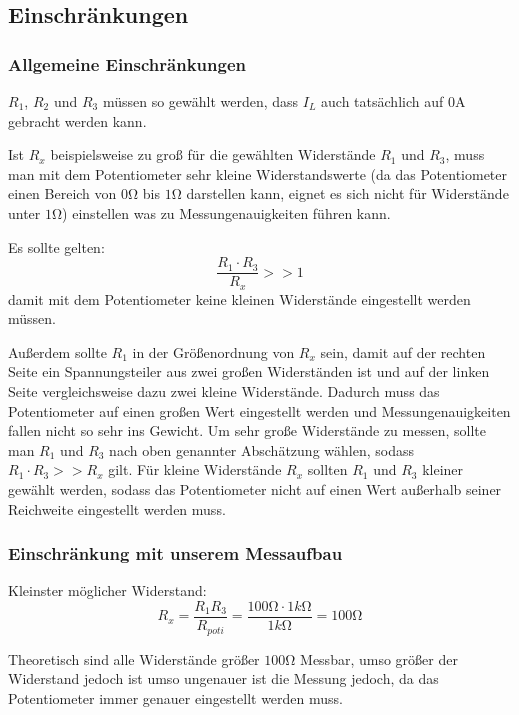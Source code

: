 \documentclass[10pt]{report}
\begin{document}
        \subsection{Einschränkungen}
        \subsubsection{Allgemeine Einschränkungen}
        $R_1$, $R_2$ und $R_3$ müssen so gewählt werden, dass $I_L$ auch tatsächlich
        auf $0$A gebracht werden kann.

        \vspace{0.5cm}

        Ist $R_x$ beispielsweise zu groß für die gewählten Widerstände $R_1$ und $R_3$, muss
        man mit dem Potentiometer sehr kleine Widerstandswerte (da das Potentiometer einen
		Bereich von $0\si{\ohm}$ bis $1\si{\ohm}$ darstellen kann, eignet es sich nicht für
		Widerstände unter $1\si{\ohm}$) einstellen was zu Messungenauigkeiten führen kann.

        Es sollte gelten:
        \begin{equation*}
            \frac{R_1 \cdot R_3}{R_x} >> 1
        \end{equation*}
        damit mit dem Potentiometer keine kleinen Widerstände eingestellt werden
        müssen.

        Außerdem sollte $R_1$ in der Größenordnung von $R_x$ sein, damit auf der
        rechten Seite ein Spannungsteiler aus zwei großen Widerständen ist und auf
        der linken Seite vergleichsweise dazu zwei kleine Widerstände. Dadurch
        muss das Potentiometer auf einen großen Wert eingestellt werden und
        Messungenauigkeiten fallen nicht so sehr ins Gewicht.
		Um sehr große Widerstände zu messen, sollte man $R_1$ und $R_3$ nach oben genannter
		Abschätzung wählen, sodass $R_1 \cdot R_3 >> R_x$ gilt. Für kleine Widerstände $R_x$
		sollten $R_1$ und $R_3$ kleiner gewählt werden, sodass das Potentiometer nicht auf einen
		Wert außerhalb seiner Reichweite eingestellt werden muss.


        \subsubsection{Einschränkung mit unserem Messaufbau}
        Kleinster möglicher Widerstand: %
        \begin{equation*}
            R_x = \frac{R_1 R_3}{R_{poti}} = \frac{100\si{\ohm} \cdot 1\si{k\ohm}}{1\si{k\ohm}} = 100\si{\ohm}
        \end{equation*}

        Theoretisch sind alle Widerstände größer $100\si{\ohm}$ Messbar, umso größer
        der Widerstand jedoch ist umso ungenauer ist die Messung jedoch, da das
        Potentiometer immer genauer eingestellt werden muss.
\end{document}
